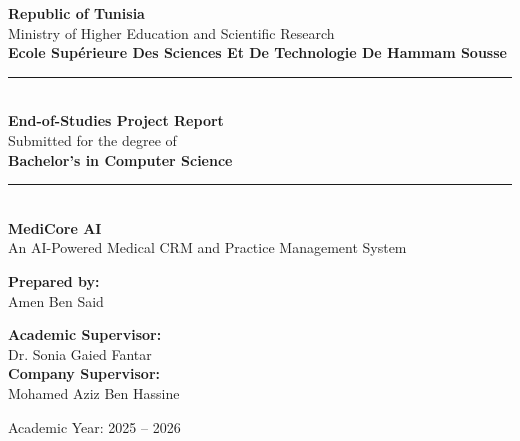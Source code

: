 \documentclass[12pt,a4paper,oneside]{report}
\begin{document}
\begin{titlepage}
\begin{center}

\vspace*{0.5cm}

{\large \textbf{Republic of Tunisia}}\\
{\large Ministry of Higher Education and Scientific Research}\\[0.3cm]
{\large \textbf{Ecole Supérieure Des Sciences Et De Technologie De Hammam Sousse}}\\

\rule{\linewidth}{0.5mm}\\[0.5cm]

{\LARGE \textbf{End-of-Studies Project Report}}\\[0.3cm]
{\large Submitted for the degree of}\\
{\large \textbf{Bachelor's in Computer Science}}\\[0.5cm]

\rule{\linewidth}{0.5mm}\\[1cm]

{\Huge \textbf{\textcolor{primary}{MediCore AI}}}\\[0.5cm]
{\Large An AI-Powered Medical CRM and Practice Management System}\\[1.5cm]

\begin{minipage}{0.45\textwidth}
\begin{flushleft}
\textbf{Prepared by:}\\
{\large Amen Ben Said}
\end{flushleft}
\end{minipage}
\hfill
\begin{minipage}{0.45\textwidth}
\begin{flushright}
\textbf{Academic Supervisor:}\\
{\large Dr. Sonia Gaied Fantar}\\[0.3cm]
\textbf{Company Supervisor:}\\
{\large Mohamed Aziz Ben Hassine}
\end{flushright}
\end{minipage}

\vfill

{\large Academic Year: 2025 -- 2026}

\end{center}
\end{titlepage}
\end{document}
